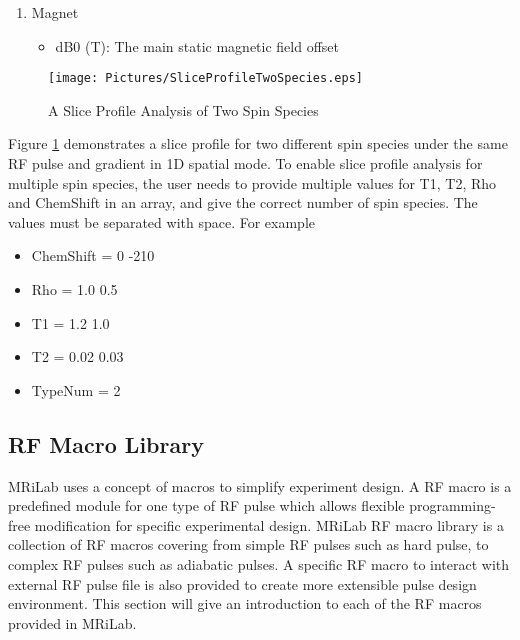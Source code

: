 \documentclass{book}%
\begin{document}
\begin{enumerate}
\begin{enumerate}
\item Magnet

\begin{itemize}
	\item dB0 (T): The main static magnetic field offset
\end{itemize}

\end{enumerate}

\begin{figure}[htbp]
	\centering
		\texttt{[image: Pictures/SliceProfileTwoSpecies.eps]}
	\caption{A Slice Profile Analysis of Two Spin Species}
	\label{fig:SliceProfileTwoSpecies}
\end{figure}

Figure \ref{fig:SliceProfileTwoSpecies} demonstrates a slice profile for two different spin species under the same RF pulse and gradient in 1D spatial mode. To enable slice profile analysis for multiple spin species, the user needs to provide multiple values for T1, T2, Rho and ChemShift in an array, and give the correct number of spin species. The values must be separated with space. For example

\begin{itemize}
	\item ChemShift = 0 -210
	\item Rho = 1.0 0.5
	\item T1 = 1.2 1.0
	\item T2 = 0.02 0.03
	\item TypeNum = 2
\end{itemize}

\end{enumerate}

\subsection{RF Macro Library}

MRiLab uses a concept of macros to simplify experiment design. A RF macro is a predefined module for one type of RF pulse which allows flexible programming-free modification for specific experimental design. MRiLab RF macro library is a collection of RF macros covering from simple RF pulses such as hard pulse, to complex RF pulses such as adiabatic pulses. A specific RF macro to interact with external RF pulse file is also provided to create more extensible pulse design environment. This section will give an introduction to each of the RF macros provided in MRiLab.
\end{document}
